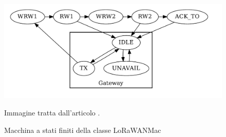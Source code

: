 \documentclass[a4paper]{report} %
\begin{document}
\begin{figure}
\centering
\includegraphics[scale=.3]{Immagini/MSFLoRaMAC.png}
\caption{Macchina a stati finiti della classe LoRaWANMac}
\label{fig:macfsm}
Immagine tratta dall'articolo \cite{art:rif.49}. \\
\end{figure}
\end{document}
